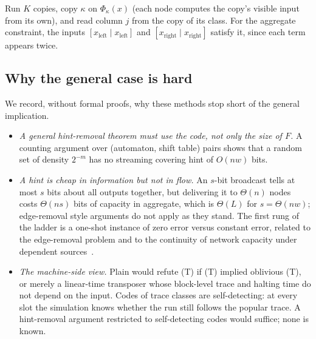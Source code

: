 \begin{outline}
Run $K$ copies, copy $\kappa$ on $\Phi_\kappa(x)$ (each node computes the copy's visible input from its
own), and read column $j$ from the copy of its class. For the aggregate constraint, the inputs
$[x_{\mathrm{left}}\mid x_{\mathrm{left}}]$ and $[x_{\mathrm{right}}\mid x_{\mathrm{right}}]$ satisfy it,
since each term appears twice.
\end{outline}

\subsection{Why the general case is hard}

We record, without formal proofs, why these methods stop short of the general implication.
\begin{itemize}[leftmargin=2em]
\item \emph{A general hint-removal theorem must use the code, not only the size of $F$.} A counting
argument over (automaton, shift table) pairs shows that a random set of density $2^{-m}$ has no
streaming covering hint of $O(nw)$ bits.
\item \emph{A hint is cheap in information but not in flow.} An $s$-bit broadcast tells at most $s$
bits about all outputs together, but delivering it to $\Theta(n)$ nodes costs $\Theta(ns)$ bits of capacity in aggregate, which is $\Theta(L)$ for $s=\Theta(nw)$; edge-removal style arguments do not apply as they stand. The first rung of the
ladder is a one-shot instance of zero error versus constant error, related to the edge-removal problem
and to the continuity of network capacity under dependent sources~\cite{LangbergEffros2021}.
\item \emph{The machine-side view.} Plain would refute (T) if (T) implied oblivious (T), or merely a
linear-time transposer whose block-level trace and halting time do not depend on the input. Codes of trace classes are
self-detecting: at every slot the simulation knows whether the run still follows the popular trace. A
hint-removal argument restricted to self-detecting codes would suffice; none is known.
\end{itemize}
